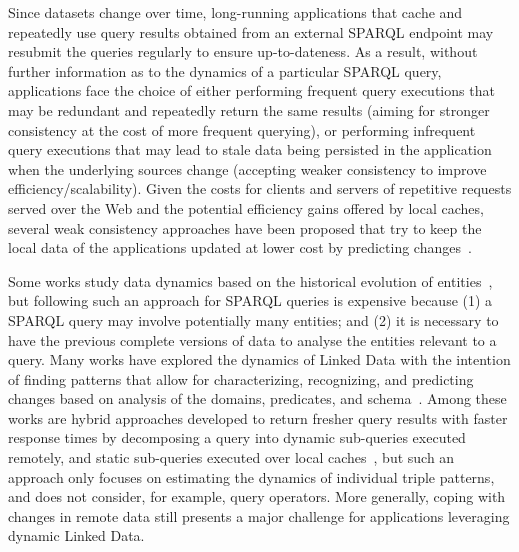\documentclass[runningheads]{llncs}
\begin{document}
Since datasets change over time, long-running applications that cache and repeatedly use query results obtained from an external SPARQL endpoint may resubmit the queries regularly to ensure up-to-dateness. As a result, without further information as to the dynamics of a particular SPARQL query, applications face the choice of either performing frequent query executions that may be redundant and repeatedly return the same results (aiming for stronger consistency at the cost of more frequent querying), or performing infrequent query executions that may lead to stale data being persisted in the application when the underlying sources change (accepting weaker consistency to improve efficiency/scalability). Given the costs for clients and servers of repetitive requests served over the Web  and the potential efficiency gains offered by local caches, several weak consistency approaches have been proposed that try to keep the local data of the applications updated at lower cost by predicting changes~\cite{KnuthHS16,DividinoGS15,NishiokaS17}.

Some works study data dynamics based on the historical evolution of entities~\cite{KaferAUOH13,DividinoGSG14,NishiokaS15}, but following such an approach for SPARQL queries is expensive because (1) a SPARQL query may involve potentially many entities; and (2) it is necessary to have the previous complete versions of data to analyse the entities relevant to a query. Many works have explored the dynamics of Linked Data with the intention of finding patterns that allow for characterizing, recognizing, and predicting changes based on analysis of the domains, predicates, and schema~\cite{UmbrichHHPD10,KaferAUOH13,NishiokaS16,NishiokaS17,GonzalezH18}. Among these works are hybrid approaches developed to return fresher query results with faster response times by decomposing a query into dynamic sub-queries executed remotely, and static sub-queries executed over local caches~\cite{UmbrichKHP12}, but such an approach only focuses on estimating the dynamics of individual triple patterns, and does not consider, for example, query operators. More generally, coping with changes in remote data still presents a major challenge for applications leveraging dynamic Linked Data.
\end{document}
